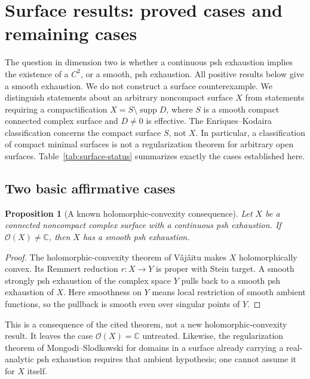 \documentclass[11pt]{amsart}
\newtheorem{proposition}[theorem]{Proposition}
\theoremstyle{definition}
\theoremstyle{remark}
\numberwithin{equation}{section}
\newcommand{\C}{\mathbb C}
\newcommand{\OO}{\mathcal O}
\newcommand{\supp}{\operatorname{supp}}
\begin{document}
\section{Surface results: proved cases and remaining cases}\label{sec:surfaces}

The question in dimension two is whether a continuous psh exhaustion
implies the existence of a $C^2$, or a smooth, psh exhaustion. All
positive results below give a smooth exhaustion. We do not construct a
surface counterexample. We distinguish statements about an arbitrary
noncompact surface $X$ from statements requiring a compactification
$X=S\setminus\supp D$, where $S$ is a smooth compact connected
complex surface and $D\ne0$ is effective.
The Enriques--Kodaira classification concerns the compact surface $S$,
not $X$. In particular, a classification of compact minimal surfaces is
not a regularization theorem for arbitrary open surfaces.
Table~\ref{tab:surface-status} summarizes exactly the cases established
here.

\subsection{Two basic affirmative cases}\label{sec:surface-curves}

\begin{proposition}[A known holomorphic-convexity consequence]
\label{prop:surface-nonconstant-function}
Let $X$ be a connected noncompact complex surface with a continuous
psh exhaustion. If $\OO(X)\ne\C$, then $X$ has a smooth psh exhaustion.
\end{proposition}
\begin{proof}
The holomorphic-convexity theorem of V\^aj\^aitu
\cite[Theorem~1.1]{Vajaitu2022} makes $X$ holomorphically convex.
Its Remmert reduction $r:X\to Y$ is proper with Stein target. A smooth
strongly psh exhaustion of the complex space $Y$ pulls back to a smooth
psh exhaustion of $X$. Here smoothness on $Y$ means local restriction
of smooth ambient functions, so the pullback is smooth even over
singular points of $Y$.
\end{proof}

This is a consequence of the cited theorem, not a new
holomorphic-convexity result. It leaves the case $\OO(X)=\C$ untreated.
Likewise, the regularization theorem of Mongodi--Slodkowski for domains
in a surface already carrying a real-analytic psh exhaustion
\cite[Corollaries~4.4--4.5]{MongodiSlodkowski2020} requires that ambient
hypothesis; one cannot assume it for $X$ itself.
\end{document}
